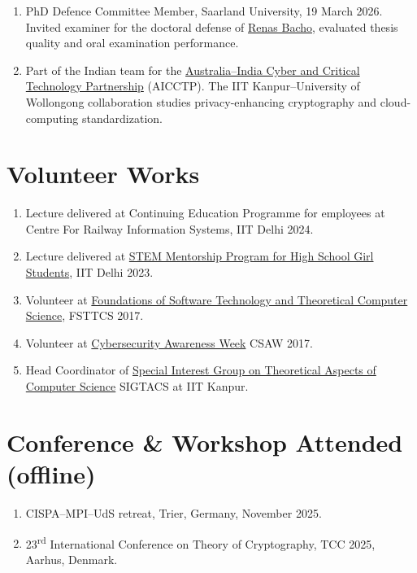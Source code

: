 \documentclass[margin]{res} %
\begin{document}
\begin{resume}
\begin{enumerate}
    \item PhD Defence Committee Member, Saarland University, 19 March 2026. Invited examiner for the doctoral defense of \href{https://publikationen.sulb.uni-saarland.de/bitstream/20.500.11880/41623/1/Enhancing%20the%20Security%20and%20Efficiency%20of%20Distributed%20Key%20Generation%20and%20Its%20Applications.pdf}{Renas Bacho}, evaluated thesis quality and oral examination performance.

    \item Part of the Indian team for the \href{https://iitk.ac.in/institute-and-uow-cloud-computing}{Australia--India Cyber and Critical Technology Partnership} (AICCTP). The IIT Kanpur--University of Wollongong collaboration studies privacy-enhancing cryptography and cloud-computing standardization.
\end{enumerate}

\section{Volunteer Works}
\begin{enumerate}
    \item Lecture delivered at Continuing Education Programme for employees at Centre For Railway Information Systems, IIT Delhi 2024.
    \item Lecture delivered at \href{https://home.iitd.ac.in/show.php?id=397&in_sections=News}{STEM Mentorship Program for High School Girl Students}, IIT Delhi 2023.

    \item Volunteer at \href{https://www.fsttcs.org.in/archives/2017/#oc}{Foundations of Software Technology and Theoretical Computer Science}, FSTTCS 2017.
    
    \item Volunteer at \href{https://cse.iitk.ac.in/doc/CSAW'17%20agenda-1%20(002).pdf}{Cybersecurity Awareness Week} CSAW 2017.
			
	\item Head Coordinator of \href{https://sigtacs.github.io}{Special Interest Group on Theoretical Aspects of Computer Science} SIGTACS at IIT Kanpur.
\end{enumerate}


\section{Conference \& Workshop Attended (offline)}
\begin{enumerate}
    \item CISPA--MPI--UdS retreat, Trier, Germany, November 2025.
    \item 23\textsuperscript{rd} International Conference on Theory of Cryptography, TCC 2025, Aarhus, Denmark.


\end{enumerate}
\end{resume}
\end{document}
